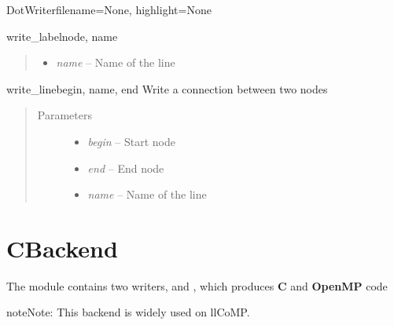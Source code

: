 \documentclass[a4paper,10pt,english]{manual}
\begin{document}
\begin{classdesc}{DotWriter}{filename=None, highlight=None}
\begin{methoddesc}{write\_label}{node, name}
\begin{quote}
\begin{description}
\begin{itemize}
\item {} 
\emph{name} -- Name of the line

\end{itemize}

\end{description}\end{quote}
\end{methoddesc}

\hypertarget{Backends.DotBackend.Writers.DotWriter.DotWriter.write\_line}{}\begin{methoddesc}{write\_line}{begin, name, end}
Write a connection between two nodes
\begin{quote}\begin{description}
\item[Parameters] \leavevmode\begin{itemize}
\item {} 
\emph{begin} -- Start node

\item {} 
\emph{end} -- End node

\item {} 
\emph{name} -- Name of the line

\end{itemize}

\end{description}\end{quote}
\end{methoddesc}
\end{classdesc}

\resetcurrentobjects
\hypertarget{--doc-cbackend}{}

\section{CBackend}
\hypertarget{module-CBackend}{}
The \hyperlink{module-CBackend}{} module contains two writers,  and ,
which produces \textbf{C} and \textbf{OpenMP} code

\begin{notice}{note}{Note:}
This backend is widely used on llCoMP.
\end{notice}
\hypertarget{module-Backends.CBackend.Writers.CWriter}{}
\modulesynopsis{}
\end{document}
